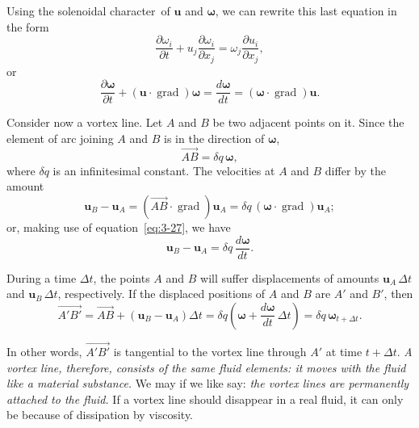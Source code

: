 Using the solenoidal character\dag\ of $\mathbf{u}$ and $\boldsymbol{\omega}$, we can rewrite this last equation in the form
\begin{equation}\label{eq:3-26}
\frac{\partial\omega_i}{\partial t} + u_j\frac{\partial\omega_i}{\partial x_j} = \omega_j\frac{\partial u_i}{\partial x_j},
\end{equation}
or
\begin{equation}\label{eq:3-27}
\frac{\partial\boldsymbol{\omega}}{\partial t} + (\mathbf{u}\cdot\operatorname{grad})\boldsymbol{\omega} = \frac{d\boldsymbol{\omega}}{dt} = (\boldsymbol{\omega}\cdot\operatorname{grad})\mathbf{u}.
\end{equation}

Consider now a vortex line. Let $A$ and $B$ be two adjacent points on it. Since the element of arc joining $A$ and $B$ is in the direction of $\boldsymbol{\omega}$,
\begin{equation}\label{eq:3-28}
\overrightarrow{AB} = \delta q\,\boldsymbol{\omega},
\end{equation}
where $\delta q$ is an infinitesimal constant. The velocities at $A$ and $B$ differ by the amount
\begin{equation}\label{eq:3-29}
\mathbf{u}_B - \mathbf{u}_A = (\overrightarrow{AB}\cdot\operatorname{grad})\mathbf{u}_A = \delta q\,(\boldsymbol{\omega}\cdot\operatorname{grad})\mathbf{u}_A;
\end{equation}
or, making use of equation~\eqref{eq:3-27}, we have
\begin{equation}\label{eq:3-30}
\mathbf{u}_B - \mathbf{u}_A = \delta q\,\frac{d\boldsymbol{\omega}}{dt}.
\end{equation}

During a time $\Delta t$, the points $A$ and $B$ will suffer displacements of amounts $\mathbf{u}_A\,\Delta t$ and $\mathbf{u}_B\,\Delta t$, respectively. If the displaced positions of $A$ and $B$ are $A'$ and $B'$, then
\begin{equation}\label{eq:3-31}
\overrightarrow{A'B'} = \overrightarrow{AB} + (\mathbf{u}_B - \mathbf{u}_A)\Delta t
= \delta q\!\left(\boldsymbol{\omega} + \frac{d\boldsymbol{\omega}}{dt}\,\Delta t\right) = \delta q\,\boldsymbol{\omega}_{t+\Delta t}.
\end{equation}

In other words, $\overrightarrow{A'B'}$ is tangential to the vortex line through $A'$ at time $t+\Delta t$. \emph{A vortex line, therefore, consists of the same fluid elements: it moves with the fluid like a material substance.} We may if we like say: \emph{the vortex lines are permanently attached to the fluid.} If a vortex line should disappear in a real fluid, it can only be because of dissipation by viscosity.

